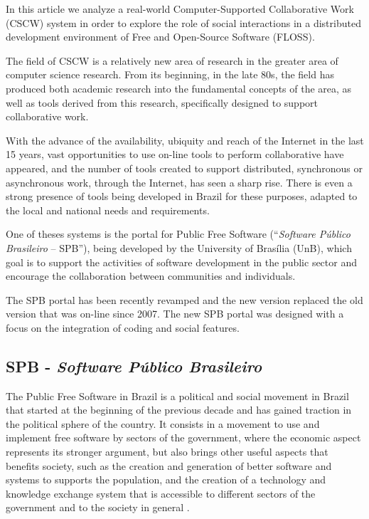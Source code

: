 \documentclass{sigchi}
\begin{document}
In this article we analyze a real-world Computer-Supported Collaborative Work (CSCW) system in order to explore the role of social interactions in a distributed development environment of Free and Open-Source Software (FLOSS).

The field of CSCW is a relatively new area of research in the greater area of computer science research. From its beginning, in the late 80s, the field has produced both academic research into the fundamental concepts of the area, as well as tools derived from this research, specifically designed to support collaborative work.

With the advance of the availability, ubiquity and reach of the Internet in the last 15 years, vast opportunities to use on-line tools to perform collaborative have appeared, and the number of tools created to support distributed, synchronous or asynchronous work, through the Internet, has seen a sharp rise. There is even a strong presence of tools being developed in Brazil for these purposes, adapted to the local and national needs and requirements.

One of theses systems is the portal for Public Free Software (``\textit{Software Público Brasileiro} – SPB''), being developed by the University of Brasília (UnB), which goal is to support the activities of software development in the public sector and encourage the collaboration between communities and individuals.

The SPB portal has been recently revamped and the new version replaced the old version that was on-line since 2007. The new SPB portal was designed with a focus on the integration of coding and social features. 

\subsection{SPB - \textit{\textbf{Software Público Brasileiro}}}

The Public Free Software in Brazil is a political and social movement in Brazil that started at the beginning of the previous decade and has gained traction in the political sphere of the country. It consists in a movement to use and implement free software by sectors of the government, where the economic aspect represents its stronger argument, but also brings other useful aspects that benefits society, such as the creation and generation of better software and systems to supports the population, and the creation of a technology and knowledge exchange system that is accessible to different sectors of the government and to the society in general \cite{DeFreitas2012}.
\end{document}
